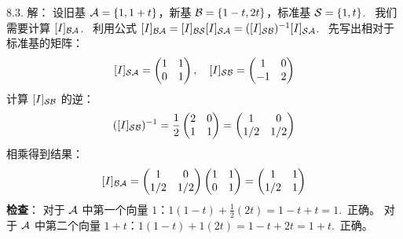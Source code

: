 \begin{exer}
8.3. 解：
设旧基 $\mathcal{A}  = \{1, 1+t\}$，新基 $\mathcal{B}  = \{1-t, 2t\}$，标准基 $\mathcal{S}  = \{1, t\}$.~
我们需要计算 $[I]_{\mathcal{B} \mathcal{A} }$.~
利用公式 $[I]_{\mathcal{B} \mathcal{A} } = [I]_{\mathcal{B} \mathcal{S} } [I]_{\mathcal{S} \mathcal{A} } = ([I]_{\mathcal{S} \mathcal{B} })^{-1} [I]_{\mathcal{S} \mathcal{A} }$.~
先写出相对于标准基的矩阵：
$$ [I]_{\mathcal{S} \mathcal{A} } = \begin{pmatrix} 1 & 1 \\ 0 & 1 \end{pmatrix}, \quad [I]_{\mathcal{S} \mathcal{B} } = \begin{pmatrix} 1 & 0 \\ -1 & 2 \end{pmatrix} $$
计算 $[I]_{\mathcal{S} \mathcal{B} }$ 的逆：
$$ ([I]_{\mathcal{S} \mathcal{B} })^{-1} = \frac{1}{2} \begin{pmatrix} 2 & 0 \\ 1 & 1 \end{pmatrix} = \begin{pmatrix} 1 & 0 \\ 1/2 & 1/2 \end{pmatrix} $$
相乘得到结果：
$$ [I]_{\mathcal{B} \mathcal{A} } = \begin{pmatrix} 1 & 0 \\ 1/2 & 1/2 \end{pmatrix} \begin{pmatrix} 1 & 1 \\ 0 & 1 \end{pmatrix} = \begin{pmatrix} 1 & 1 \\ 1/2 & 1 \end{pmatrix} $$
\textbf{检查}：
对于 $\mathcal{A} $ 中第一个向量 $1$：$1(1-t) + \frac{1}{2}(2t) = 1 - t + t = 1$.~正确。
对于 $\mathcal{A} $ 中第二个向量 $1+t$：$1(1-t) + 1(2t) = 1 - t + 2t = 1+t$.~正确。


\end{exer}
